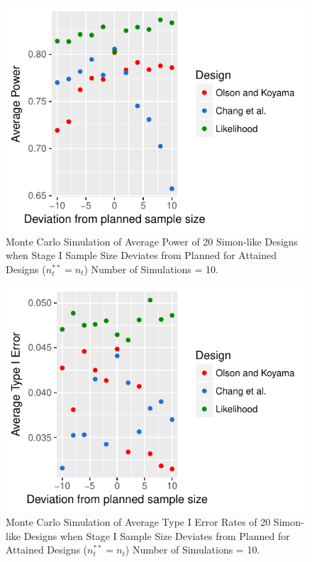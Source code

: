 \documentclass[12pt]{report}\usepackage[]{graphicx}\usepackage[]{color}
\newlength{\li}\setlength{\li}{14.48pt}
\begin{document}
\begin{figure}[]
\caption{Monte Carlo Simulation of Average Power of 20 Simon-like Designs when Stage I Sample Size Deviates from Planned for Attained Designs ($n_t^{\ast\ast} = n_t$) Number of Simulations = 10.}
\begin{Schunk}


\centerline{\includegraphics{unnamed-chunk-14-1} }

\end{Schunk}
\end{figure}

\begin{figure}[]
\caption{Monte Carlo Simulation of Average Type I Error Rates of 20 Simon-like Designs when Stage I Sample Size Deviates from Planned for Attained Designs ($n_t^{\ast\ast} = n_t$) Number of Simulations = 10.}
\begin{Schunk}


\centerline{\includegraphics{unnamed-chunk-15-1} }

\end{Schunk}
\end{figure}
\end{document}
